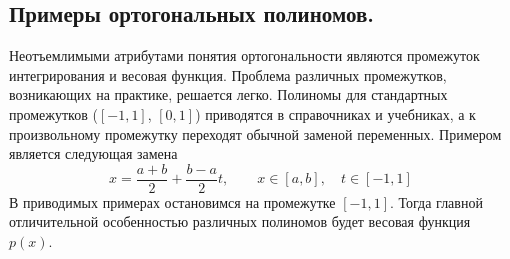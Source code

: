\subsection{Примеры ортогональных полиномов.}
Неотъемлимыми атрибутами понятия ортогональности являются промежуток интегрирования и
весовая функция. Проблема различных промежутков, возникающих на практике, решается легко.
Полиномы для стандартных промежутков ($[-1, 1]$, $[0, 1]$) приводятся в справочниках и
учебниках, а к произвольному промежутку переходят обычной заменой переменных. Примером
является следующая замена
\begin{equation*}
    x = \frac{a + b}{2} + \frac{b - a}{2}t, \qquad x \in [a, b], \quad t \in [-1, 1]
\end{equation*}
В приводимых примерах остановимся на промежутке $[-1, 1]$. Тогда главной отличительной
особенностью различных полиномов будет весовая функция $p(x)$.
